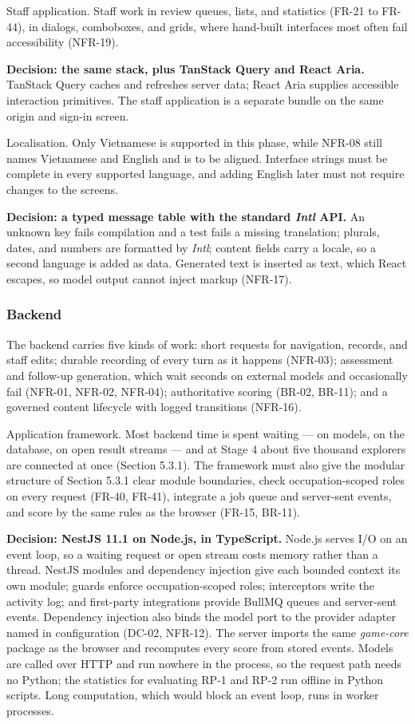 Staff application. Staff work in review queues, lists, and statistics (FR-21 to FR-44), in dialogs, comboboxes, and grids, where hand-built interfaces most often fail accessibility (NFR-19).

\textbf{Decision: the same stack, plus TanStack Query and React Aria.} TanStack Query caches and refreshes server data\cite{r147}; React Aria supplies accessible interaction primitives\cite{r148}. The staff application is a separate bundle on the same origin and sign-in screen.

Localisation. Only Vietnamese is supported in this phase, while NFR-08 still names Vietnamese and English and is to be aligned. Interface strings must be complete in every supported language, and adding English later must not require changes to the screens.

\textbf{Decision: a typed message table with the standard \textit{Intl} API.} An unknown key fails compilation and a test fails a missing translation; plurals, dates, and numbers are formatted by \textit{Intl}\cite{r149}; content fields carry a locale, so a second language is added as data. Generated text is inserted as text, which React escapes, so model output cannot inject markup (NFR-17)\cite{r150}.

\subsubsection{Backend}

The backend carries five kinds of work: short requests for navigation, records, and staff edits; durable recording of every turn as it happens (NFR-03); assessment and follow-up generation, which wait seconds on external models and occasionally fail (NFR-01, NFR-02, NFR-04); authoritative scoring (BR-02, BR-11); and a governed content lifecycle with logged transitions (NFR-16).

Application framework. Most backend time is spent waiting --- on models, on the database, on open result streams --- and at Stage 4 about five thousand explorers are connected at once (Section 5.3.1). The framework must also give the modular structure of Section 5.3.1 clear module boundaries, check occupation-scoped roles on every request (FR-40, FR-41), integrate a job queue and server-sent events, and score by the same rules as the browser (FR-15, BR-11).

\textbf{Decision: NestJS 11.1 on Node.js, in TypeScript.} Node.js serves I/O on an event loop, so a waiting request or open stream costs memory rather than a thread. NestJS modules and dependency injection give each bounded context its own module; guards enforce occupation-scoped roles; interceptors write the activity log; and first-party integrations provide BullMQ queues and server-sent events\cite{r151}. Dependency injection also binds the model port to the provider adapter named in configuration (DC-02, NFR-12)\cite{r152}. The server imports the same \textit{game-core} package as the browser and recomputes every score from stored events. Models are called over HTTP and run nowhere in the process, so the request path needs no Python; the statistics for evaluating RP-1 and RP-2 run offline in Python scripts. Long computation, which would block an event loop, runs in worker processes.


